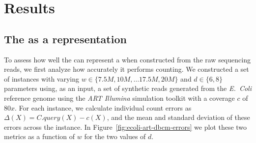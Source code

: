 \chapter{Results}

\section{The \dBCM as a \dBG representation}

To assess how well the \dBCM can represent a \dBG when constructed from the raw sequencing reads, we first analyze how accurately it performs \kmer counting. We constructed a set of \dBCM instances with varying $w \in \{7.5M, 10M, \ldots 17.5M, 20M\}$ and $d \in \{6, 8\}$ parameters using, as an input, a set of synthetic reads generated from the \emph{E.~Coli} reference genome \cite{ecoligenome} using the \emph{ART Illumina} simulation toolkit \cite{Huang2011} with a coverage $c$ of $80x$. For each instance, we calculate individual count errors as $\Delta(X) = C.\mathit{query}(X) - c(X)$, and the mean and standard deviation of these errors across the instance. In Figure~\ref{fig:ecoli-art-dbcm-errors} we plot these two metrics as a function of $w$ for the two values of $d$.

